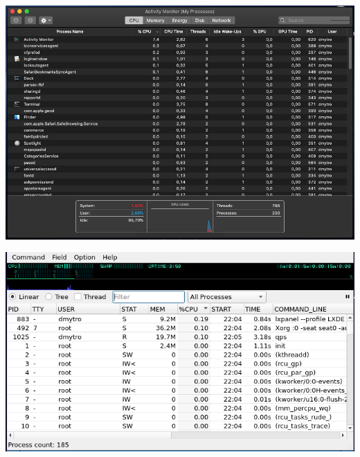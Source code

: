 \documentclass{article}
\begin{document}
\begin{normalsize}
\begin{center}
		\includegraphics[scale=0.5]{sm2}
	\end{center}
	\begin{center}
		\includegraphics[scale=0.5]{qps1}
	\end{center}


\end{normalsize}
\end{document}
